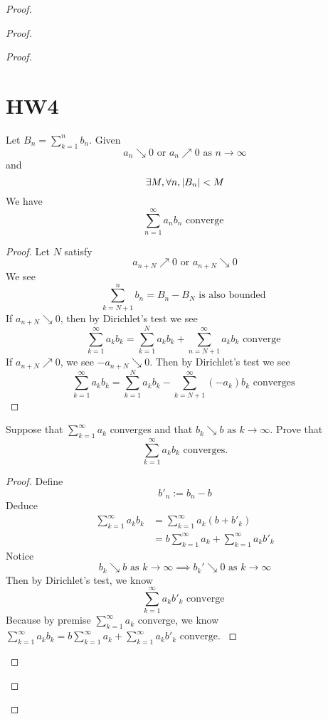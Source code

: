 \documentclass{report}
\begin{document}
\begin{proof}
\begin{proof}
\begin{proof}
\section{HW4}
\begin{theorem}
\label{8.4.1}
Let $B_n=\sum_{k=1}^n b_n$. Given
\begin{equation}
  a_n\searrow 0\text{ or }a_n\nearrow 0\text{ as }n\to\infty
\end{equation}
and 
\begin{equation}
\exists M, \forall n, |B_n|<M
\end{equation}
We have
\begin{equation}
\sum_{n=1}^\infty a_nb_n\text{ converge }
\end{equation}
\end{theorem}
\begin{proof}
Let $N$ satisfy
 \begin{equation}
a_{n+N}\nearrow 0\text{ or }a_{n+N}\searrow 0
\end{equation}
We see 
\begin{equation}
\sum_{k=N+1}^n b_n=B_n-B_N\text{ is also bounded }
\end{equation}
If $a_{n+N}\searrow 0$, then by Dirichlet's test we see
\begin{equation}
\sum_{k=1}^\infty a_kb_k=\sum_{k=1}^{N}a_kb_k+\sum_{n=N+1}^\infty a_kb_k\text{ converge }
\end{equation}
If $a_{n+N}\nearrow 0$, we see $-a_{n+N}\searrow 0$. Then by Dirichlet's test we see
\begin{equation}
\sum_{k=1}^\infty a_kb_k=\sum_{k=1}^N a_kb_k - \sum_{k=N+1}^\infty (-a_k)b_k\text{ converges }
\end{equation}
\end{proof}


\begin{question}{}{}
Suppose that $\sum_{k=1}^{\infty} a_k$ 
converges and that 
$b_k \searrow b \text{ as } k \to \infty$. Prove that 
\begin{equation}
  \sum_{k=1}^{\infty} a_k b_k \text{ converges.}
\end{equation}
\end{question}
\begin{proof}
Define
\begin{equation}
b'_n:=b_n-b
\end{equation}
Deduce
\begin{align}
  \sum_{k=1}^\infty a_kb_k&=\sum_{k=1}^\infty a_k(b+b'_k)\\
  &=b\sum_{k=1}^\infty a_k+\sum_{k=1}^\infty a_kb'_k
\end{align}
Notice
\begin{equation}
b_k\searrow b\text{ as }k\to\infty\implies b_k'\searrow 0\text{ as }k\to\infty
\end{equation}
Then by Dirichlet's test, we know
\begin{equation}
\sum_{k=1}^\infty a_kb'_k\text{ converge }
\end{equation}
Because by premise $\sum_{k=1}^\infty a_k$ converge, we know $\sum_{k=1}^\infty a_kb_k=b\sum_{k=1}^\infty a_k+\sum_{k=1}^\infty a_kb'_k\text{ converge. }$



\end{proof}
\end{proof}
\end{proof}
\end{proof}
\end{document}
